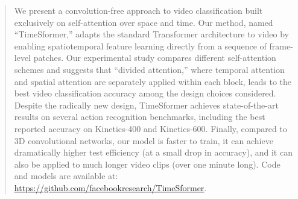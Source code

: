 \documentclass{article}
\begin{document}

\printAffiliationsAndNotice{}  %

\begin{abstract}



We present a convolution-free approach to video classification built exclusively on self-attention over space and time. Our method, named ``TimeSformer,'' adapts the standard Transformer architecture to video by enabling spatiotemporal feature learning directly from a sequence of frame-level patches. Our  experimental study compares different self-attention schemes and suggests that ``divided attention,'' where temporal attention and spatial attention are separately applied within each block, leads to the best video classification accuracy among the design choices considered. Despite the radically new design, TimeSformer achieves state-of-the-art results on several action recognition benchmarks, including the best reported accuracy on Kinetics-400 and Kinetics-600. Finally, compared to 3D convolutional networks, our model is faster to train, it can achieve dramatically higher test efficiency (at a small drop in accuracy), and it can also be applied to much longer video clips (over one minute long). Code and models are available at:  \url{https://github.com/facebookresearch/TimeSformer}.


\end{abstract}
\end{document}
